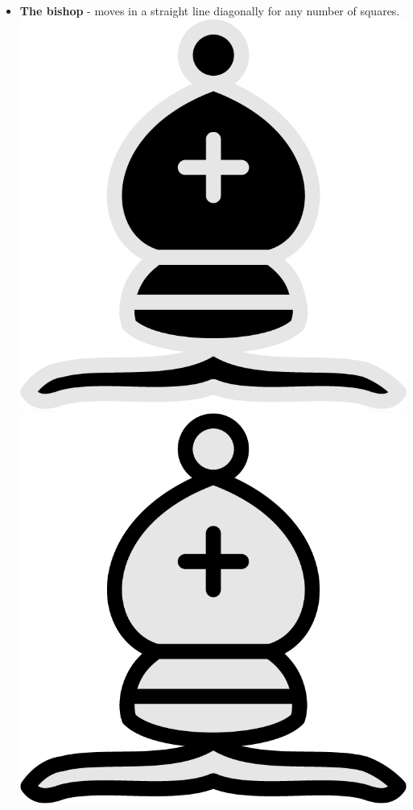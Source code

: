 \documentclass{article}
\begin{document}
\begin{itemize}
    \item \textbf{The bishop} - moves in a straight line diagonally for any number of squares.\\
    \includegraphics[scale=0.1]{image1.png}
    \includegraphics[scale=0.1]{image16.png}
    

\end{itemize}
\end{document}
